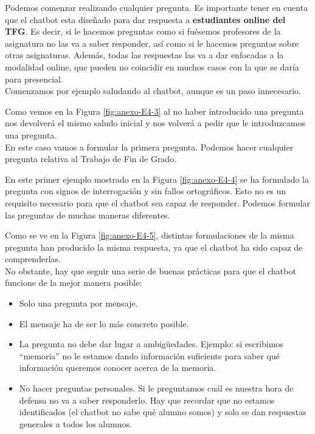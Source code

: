 
Podemos comenzar realizando cualquier pregunta. Es importante tener en cuenta que el chatbot esta diseñado para dar respuesta a \textbf{estudiantes online del TFG}. Es decir, si le hacemos preguntas como si fuésemos profesores de la asignatura no las va a saber responder, así como si le hacemos preguntas sobre otras asignaturas. Además, todas las respuestas las va a dar enfocadas a la modalidad online, que pueden no coincidir en muchos casos con la que se daría para presencial.\\
Comenzamos por ejemplo saludando al chatbot, aunque es un paso innecesario.


Como vemos en la Figura \ref{fig:anexo-E4-3} al no haber introducido una pregunta nos devolverá el mismo saludo inicial y nos volverá a pedir que le introduzcamos una pregunta.\\
En este caso vamos a formular la primera pregunta. Podemos hacer cualquier pregunta relativa al Trabajo de Fin de Grado. 


En este primer ejemplo mostrado en la Figura \ref{fig:anexo-E4-4} se ha formulado la pregunta con signos de interrogación y sin fallos ortográficos. Esto no es un requisito necesario para que el chatbot sea capaz de responder. Podemos formular las preguntas de muchas maneras diferentes.



Como se ve en la Figura \ref{fig:anexo-E4-5}, distintas formulaciones de la misma pregunta han producido la misma respuesta, ya que el chatbot ha sido capaz de comprenderlas. \\
No obstante, hay que seguir una serie de buenas prácticas para que el chatbot funcione de la mejor manera posible:
\begin{itemize}
	\tightlist
	\item
	Solo una pregunta por mensaje.
	\item
	El mensaje ha de ser lo más concreto posible.
	\item
	La pregunta no debe dar lugar a ambigüedades. Ejemplo: si escribimos ``memoria'' no le estamos dando información suficiente para saber qué información queremos conocer acerca de la memoria.
	\item
	No hacer preguntas personales. Si le preguntamos cuál es nuestra hora de defensa no va a saber responderlo. Hay que recordar que no estamos identificados (el chatbot no sabe qué alumno somos) y solo se dan respuestas generales a todos los alumnos.
\end{itemize}


